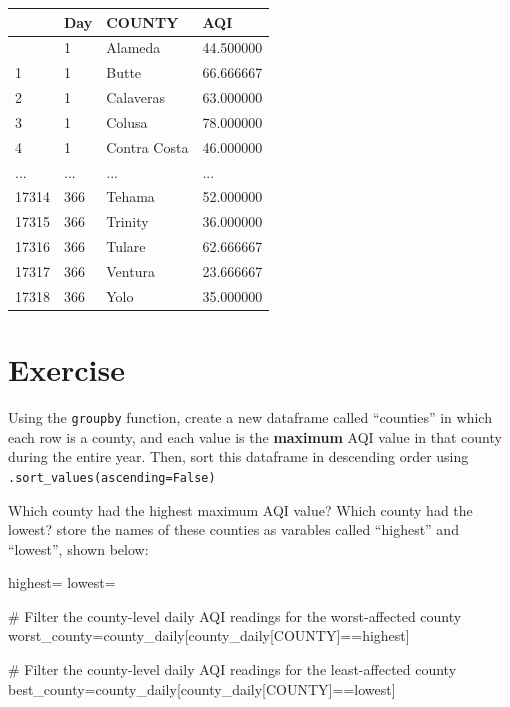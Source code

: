 \documentclass[
  letterpaper,
  DIV=11,
  numbers=noendperiod]{scrreprt}
\newenvironment{Shaded}{\begin{snugshade}}{\end{snugshade}}
\newcommand{\CommentTok}[1]{\textcolor[rgb]{0.37,0.37,0.37}{#1}}
\newcommand{\NormalTok}[1]{\textcolor[rgb]{0.00,0.23,0.31}{#1}}
\newcommand{\OperatorTok}[1]{\textcolor[rgb]{0.37,0.37,0.37}{#1}}
\newcommand{\StringTok}[1]{\textcolor[rgb]{0.13,0.47,0.30}{#1}}
\begin{document}
\begin{longtable}[]{@{}llll@{}}
\toprule\noalign{}
& Day & COUNTY & AQI \\
\midrule\noalign{}
\endhead
\bottomrule\noalign{}
\endlastfoot
0 & 1 & Alameda & 44.500000 \\
1 & 1 & Butte & 66.666667 \\
2 & 1 & Calaveras & 63.000000 \\
3 & 1 & Colusa & 78.000000 \\
4 & 1 & Contra Costa & 46.000000 \\
... & ... & ... & ... \\
17314 & 366 & Tehama & 52.000000 \\
17315 & 366 & Trinity & 36.000000 \\
17316 & 366 & Tulare & 62.666667 \\
17317 & 366 & Ventura & 23.666667 \\
17318 & 366 & Yolo & 35.000000 \\
\end{longtable}

\hypertarget{exercise-5}{%
\section{Exercise}\label{exercise-5}}

Using the \texttt{groupby} function, create a new dataframe called
``counties'' in which each row is a county, and each value is the
\textbf{maximum} AQI value in that county during the entire year. Then,
sort this dataframe in descending order using
\texttt{.sort\_values(ascending=False)}

Which county had the highest maximum AQI value? Which county had the
lowest? store the names of these counties as varables called ``highest''
and ``lowest'', shown below:

\begin{Shaded}
\begin{Highlighting}[]
\NormalTok{highest}\OperatorTok{=}\StringTok{\textquotesingle{}\textquotesingle{}}
\NormalTok{lowest}\OperatorTok{=}\StringTok{\textquotesingle{}\textquotesingle{}}

\CommentTok{\# Filter the county{-}level daily AQI readings for the worst{-}affected county}
\NormalTok{worst\_county}\OperatorTok{=}\NormalTok{county\_daily[county\_daily[}\StringTok{\textquotesingle{}COUNTY\textquotesingle{}}\NormalTok{]}\OperatorTok{==}\NormalTok{highest]}

\CommentTok{\# Filter the county{-}level daily AQI readings for the least{-}affected county}
\NormalTok{best\_county}\OperatorTok{=}\NormalTok{county\_daily[county\_daily[}\StringTok{\textquotesingle{}COUNTY\textquotesingle{}}\NormalTok{]}\OperatorTok{==}\NormalTok{lowest]}
\end{Highlighting}
\end{Shaded}
\end{document}
